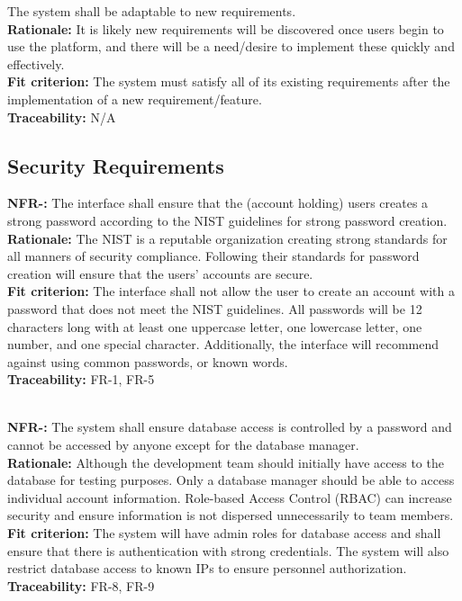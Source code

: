 \documentclass[12pt, titlepage]{article}
\newcounter{NFR_Counter}
\newcounter{FR_Counter}
\begin{document}
The system shall be adaptable to new requirements.\\
\textbf{Rationale:}
It is likely new requirements will be discovered once users begin to use the platform, and there will be a need/desire to 
implement these quickly and effectively.\\
\textbf{Fit criterion:}
The system must satisfy all of its existing requirements after the implementation of a new requirement/feature.\\
\textbf{Traceability:}
N/A
\addtocounter{NFR_Counter}{1}


\subsection{Security Requirements}
\noindent\textbf{NFR-\the\value{NFR_Counter}:}
The interface shall ensure that the (account holding) users creates a strong password
according to the NIST guidelines for strong password creation.  \\
\textbf{Rationale:}
The NIST is a reputable organization creating strong standards for all manners of security compliance. 
Following their standards for password creation will ensure that the users' accounts are secure. \\
\textbf{Fit criterion:}
The interface shall not allow the user to create an account with a password that does not meet the NIST guidelines.
All passwords will be 12 characters long with at least one uppercase letter, one lowercase letter, one number, and one special character. 
Additionally, the interface will recommend against using common passwords, or known words. \\
\textbf{Traceability:}
FR-1, FR-5\\~\\
\addtocounter{NFR_Counter}{1}

\noindent\textbf{NFR-\the\value{NFR_Counter}:}
The system shall ensure database access is controlled by a password and cannot be accessed by anyone except for the database manager.  \\
\textbf{Rationale:}
Although the development team should initially have access to the database for testing purposes. 
Only a database manager should be able to access individual account information. 
Role-based Access Control (RBAC) can increase security and ensure information is not dispersed unnecessarily to team members.    \\
\textbf{Fit criterion:}
The system will have admin roles for database access and shall ensure that there is authentication with strong credentials. 
The system will also restrict database access to known IPs to ensure personnel authorization. \\
\textbf{Traceability:}
FR-8, FR-9\\~\\
\addtocounter{NFR_Counter}{1}
\end{document}
